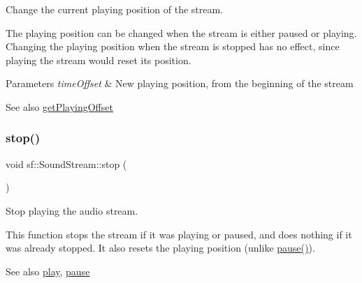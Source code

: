 Change the current playing position of the stream. 

The playing position can be changed when the stream is either paused or playing. Changing the playing position when the stream is stopped has no effect, since playing the stream would reset its position.


\begin{DoxyParams}{Parameters}
{\em time\+Offset} & New playing position, from the beginning of the stream\\
\hline
\end{DoxyParams}
\begin{DoxySeeAlso}{See also}
\mbox{\hyperlink{classsf_1_1_sound_stream_ae288f3c72edbad9cc7ee938ce5b907c1}{get\+Playing\+Offset}} \begin{DoxyVerb}\end{DoxyVerb}
 
\end{DoxySeeAlso}
\mbox{\label{classsf_1_1_sound_stream_a16cc6a0404b32e42c4dce184bb94d0f4}} 
\subsubsection{\texorpdfstring{stop()}{stop()}}
{\footnotesize\ttfamily void sf\+::\+Sound\+Stream\+::stop (\begin{DoxyParamCaption}{ }\end{DoxyParamCaption})\hspace{0.3cm}{\ttfamily [virtual]}}



Stop playing the audio stream. 

This function stops the stream if it was playing or paused, and does nothing if it was already stopped. It also resets the playing position (unlike \mbox{\hyperlink{classsf_1_1_sound_stream_a932ff181e661503cad288b4bb6fe45ca}{pause()}}).

\begin{DoxySeeAlso}{See also}
\mbox{\hyperlink{classsf_1_1_sound_stream_afdc08b69cab5f243d9324940a85a1144}{play}}, \mbox{\hyperlink{classsf_1_1_sound_stream_a932ff181e661503cad288b4bb6fe45ca}{pause}} \begin{DoxyVerb}\end{DoxyVerb}
 
\end{DoxySeeAlso}


